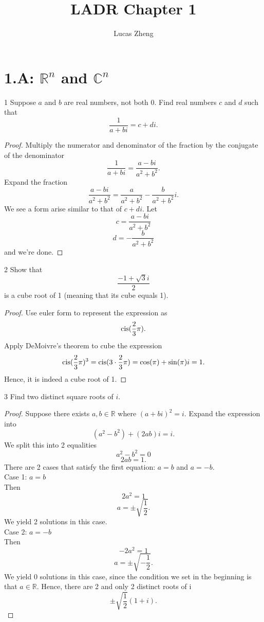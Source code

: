 \documentclass[12pt, letterpaper]{article}
\title{LADR Chapter 1}
\author{Lucas Zheng}
\date{}
\begin{document}
\maketitle

\section*{1.A: $\mathbb{R}^n$ and $\mathbb{C}^n$}

\begin{problem}{1}
Suppose $a$ and $b$ are real numbers, not both 0. Find real numbers $c$ and
$d$ such that
$${\frac{1}{a+bi}}=c+di.$$
\end{problem}

\begin{proof} 
Multiply the numerator and denominator of the fraction by the conjugate of the denominator
$$\frac{1}{a+bi} = \frac{a-bi}{a^2+b^2}.$$
Expand the fraction
$$\frac{a-bi}{a^2+b^2} = \frac{a}{a^2+b^2} - \frac{b}{a^2+b^2}i.$$
We see a form arise similar to that of ${c+di}$. Let
$$c = \frac{a-bi}{a^2+b^2}$$
$$d = -\frac{b}{a^2+b^2}$$
and we're done.
\end{proof}

\begin{problem}{2}
Show that
$$\frac{-1+\sqrt{3}i}{2}$$
is a cube root of 1 (meaning that its cube equals 1).
\end{problem}

\begin{proof}
Use euler form to represent the expression as
$$\operatorname{cis}(\frac{2}{3}\pi).$$
Apply DeMoivre's theorem to cube the expression
$$\operatorname{cis}(\frac{2}{3}\pi)^3 = \operatorname{cis}(3\cdot\frac{2}{3}\pi) = \cos(\pi) + \sin(\pi)i = 1.$$
Hence, it is indeed a cube root of 1.
\end{proof}

\begin{problem}{3}
Find two distinct square roots of $i$.
\end{problem}

\begin{proof}
Suppose there exists $a,b\in\mathbb{R}$ where $(a+bi)^2 = i$. Expand the expression into
$$(a^2-b^2)+(2ab)i = i.$$
We split this into 2 equalities
$$a^2-b^2=0$$
$$2ab = 1.$$
There are 2 cases that satisfy the first equation: $a = b$ and $a = -b$.
\\Case 1: $a=b$
\\Then
$$2a^2 = 1$$
$$a = \pm\sqrt{\frac{1}{2}}.$$
We yield 2 solutions in this case.
\\Case 2: $a=-b$
\\Then
$$-2a^2 = 1$$
$$a = \pm\sqrt{-\frac{1}{2}}.$$
We yield 0 solutions in this case, since the condition we set in the beginning is that $a\in\mathbb{R}$.
Hence, there are 2 and only 2 distinct roots of i
$$\pm\sqrt{\frac{1}{2}}(1+i).$$
\end{proof}
\end{document}

